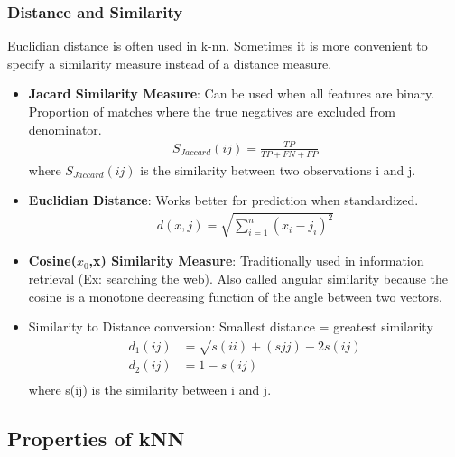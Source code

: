 \documentclass[12pt, oneside]{article}
\begin{document}
\subsubsection{Distance and Similarity}
Euclidian distance is often used in k-nn. Sometimes it is more convenient to specify a similarity measure instead of a distance measure. 
\begin{itemize}
    \item \textbf{Jacard Similarity Measure}: Can be used when all features are binary. Proportion of matches where the true negatives are excluded from denominator. 
    \begin{align*}
        S_{Jaccard}(ij) = \frac{TP}{TP + FN + FP}
    \end{align*}
     where $S_{Jaccard}(ij)$ is the similarity between two observations i and j. 
    \item \textbf{Euclidian Distance}: Works better for prediction when standardized.
    \begin{align*}
        d(x,j) = \sqrt{\sum^n_{i=1}(x_i - j_i)^2}
    \end{align*}
    \item \textbf{Cosine($x_0$,x) Similarity Measure}: Traditionally used in information retrieval (Ex: searching the web). Also called angular similarity because the cosine is a monotone decreasing function of the angle between two vectors.  
    
    \item Similarity to Distance conversion: Smallest distance = greatest similarity
    \begin{align*}
        d_1(ij) &= \sqrt{s(ii) + (sjj) - 2s(ij)} \\
        d_2(ij) &= 1 - s(ij) \\
    \end{align*}
    where s(ij) is the similarity between i and j.
\end{itemize}

\subsection{Properties of kNN}
\end{document}
